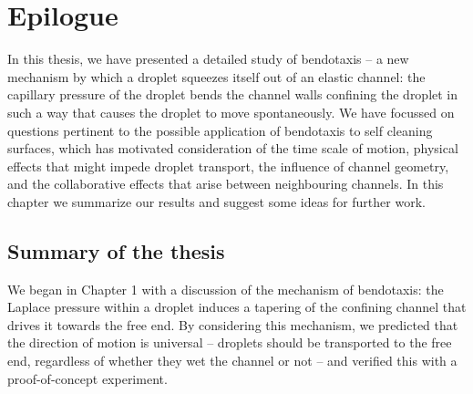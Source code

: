 \chapter{Epilogue}
In this thesis, we have presented a detailed study of bendotaxis -- a new mechanism by which a droplet squeezes itself out of an elastic channel: the capillary pressure of the droplet bends the channel walls confining the droplet in such a way that causes the droplet to move spontaneously.  We have focussed on questions pertinent to the possible application of bendotaxis to self cleaning surfaces, which has motivated consideration of the time scale of motion, physical effects that might impede droplet transport, the influence of channel geometry, and the collaborative effects that arise between neighbouring channels. In this chapter we summarize our results and suggest some ideas for further work.

\section{Summary of the thesis}
We began in Chapter 1 with a discussion of the mechanism of bendotaxis: the Laplace pressure within a droplet induces a tapering of the confining channel that drives it towards the free end. By considering this mechanism, we predicted that the direction of motion is universal -- droplets should be transported to the free end, regardless of whether they wet the channel or not -- and verified this with a proof-of-concept experiment.

